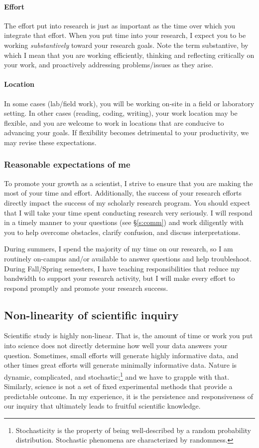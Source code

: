 \paragraph{Effort}
The effort put into research is just as important as the time over which you integrate that effort. When you put time into your research, I expect you to be working \emph{substantively} toward your research goals. Note the term substantive, by which I mean that you are working efficiently, thinking and reflecting critically on your work, and proactively addressing problems/issues as they arise.

\paragraph{Location}
In some cases (lab/field work), you will be working on-site in a field or laboratory setting.
In other cases (reading, coding, writing), your work location may be flexible, and you are welcome to work in locations that are conducive to advancing your goals.
If flexibility becomes detrimental to your productivity, we may revise these expectations. 

\subsubsection{Reasonable expectations of me}
To promote your growth as a scientist, I strive to ensure that you are making the most of your time and effort.
Additionally, the success of your research efforts directly impact the success of my scholarly research program.
You should expect that I will take your time spent conducting research very seriously. 
I will respond in a timely manner to your questions (see \S\ref{s:comm}) and work diligently with you to help overcome obstacles, clarify confusion, and discuss interpretations. 

During summers, I spend the majority of my time on our research, so I am routinely on-campus and/or available to answer questions and help troubleshoot.
During Fall/Spring semesters, I have teaching responsibilities that reduce my bandwidth to support your research activity, but I will make every effort to respond promptly and promote your research success.

\subsection{Non-linearity of scientific inquiry}\label{s:sciphi}
Scientific study is highly non-linear.
That is, the amount of time or work you put into science does not directly determine how well your data answers your question. 
Sometimes, small efforts will generate highly informative data, and other times great efforts will generate minimally informative data.
Nature is dynamic, complicated, and stochastic;\footnote{Stochasticity is the property of being well-described by a random probability distribution. Stochastic phenomena are characterized by randomness.} and we have to grapple with that.
Similarly, science is not a set of fixed experimental methods that provide a predictable outcome.
In my experience, it is the persistence and responsiveness of our inquiry that ultimately leads to fruitful scientific knowledge.

